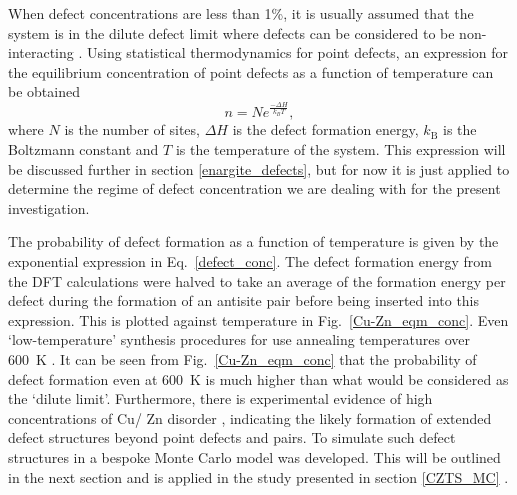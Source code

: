 \documentclass[11pt, twoside]{report}
\begin{document}
When defect concentrations are less than 1\%, it is usually assumed that the system is in the dilute defect limit where defects can be considered to be non-interacting \cite{Stoneham_defect_lim}. Using statistical thermodynamics for point defects, an expression for the equilibrium concentration of point defects as a function of temperature can be obtained \cite{thermodynamics}
\begin{equation} \label{defect_conc}
n = Ne^{\frac{-\Delta H}{k_BT}},
\end{equation}
where $N$ is the number of sites, $\Delta H$ is the defect formation energy, $k_\mathrm{B}$ is the Boltzmann constant and $T$ is the temperature of the system. This expression will be discussed further in section \ref{enargite_defects}, but for now it is just applied to determine the regime of defect concentration we are dealing with for the present investigation.

The probability of defect formation as a function of temperature is given by the exponential expression in Eq.~\ref{defect_conc}. The defect formation energy from the DFT calculations were halved to take an average of the formation energy per defect during the formation of an antisite pair before being inserted into this expression. This is plotted against temperature in Fig.~\ref{Cu-Zn_eqm_conc}. 
Even `low-temperature' synthesis procedures for {\CZTS} use annealing temperatures over \SI{600}{K} \cite{low_T_CZTS}. It can be seen from Fig.~\ref{Cu-Zn_eqm_conc} that the probability of defect formation even at \SI{600}{K} is much higher than what would be considered as the `dilute limit'.
Furthermore, there is experimental evidence of high concentrations of Cu/ Zn disorder \cite{Scragg, pot_fluc_4, neutron, Schorr}, indicating the likely formation of extended defect structures beyond point defects and pairs. To simulate such defect structures in {\CZTS} a bespoke Monte Carlo model was developed. This will be outlined in the next section and is applied in the study presented in section \ref{CZTS_MC} \cite{eris_paper}.
\end{document}
